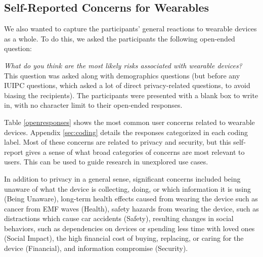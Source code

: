 \subsection{Self-Reported Concerns for Wearables}
We also wanted to capture the participants' general reactions to wearable devices as a whole. To do this, we asked the participants the following open-ended question:

\textit{What do you think are the most likely risks associated with wearable devices?}\\[-.5cm]

This question was asked along with demographics questions (but before any IUIPC questions, which asked a lot of direct privacy-related questions, to avoid biasing the recipients). The participants were presented with a blank box to write in, with no character limit to their open-ended responses. 

 Table \ref{openresponses} shows the most common user concerns related to wearable devices. Appendix \ref{sec:coding} details the responses categorized in each coding label. Most of these concerns are related to privacy and security, but this self-report gives a sense of what broad categories of concerns are most relevant to users. This can be used to guide research in unexplored use cases. 

In addition to privacy in a general sense, significant concerns included being unaware of what the device is collecting, doing, or which information it is using (Being Unaware), long-term health effects caused from wearing the device such as cancer from EMF waves (Health), safety hazards from wearing the device, such as distractions which cause car accidents (Safety), resulting changes in social behaviors, such as dependencies on devices or spending less time with loved ones (Social Impact), the high financial cost of buying, replacing, or caring for the device (Financial), and information compromise (Security).

